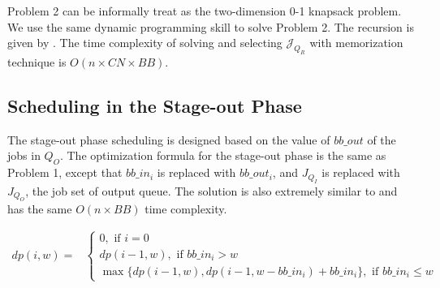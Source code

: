 Problem 2 can be informally treat as the two-dimension 0-1 knapsack problem.
We use the same dynamic programming skill to solve Problem 2.
The recursion is given by .
The time complexity of solving  and selecting $\mathcal{J}_{Q_R}$ with memorization technique is $O(n\times CN\times BB)$.


\subsection{Scheduling in the Stage-out Phase}
\label{SubSec:OptStageOut}

The stage-out phase scheduling is designed based on the value of $bb\_out$ of the jobs in $Q_O$.
The optimization formula for the stage-out phase is the same as Problem 1, 
except that $bb\_in_i$ is replaced with $bb\_out_i$, 
and $J_{Q_I}$ is replaced with $J_{Q_O}$, the job set of output queue.
The solution is also extremely similar to  and
has the same $O(n\times BB)$ time complexity.


%
%


\begin{strip}
        \begin{align}
                dp(i, w) = & 
                \left\{
                        \begin{array}{l}
                                0, \text{ if $i=0$ } \\ [0.6em]
                                dp(i-1, w), \text{ if $bb\_in_i > w$} \\ [0.6em]
                                \max \{ dp(i-1, w), dp(i-1, w-bb\_in_i) + bb\_in_i \}, \text{ if $bb\_in_i \leq w$}
                        \end{array} 
                \right.
                \label{Equ:MaxTransferDataRecursion} 
        \end{align}
\end{strip}

